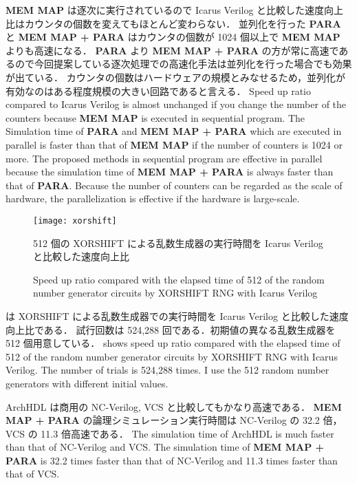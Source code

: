 \textbf{MEM MAP} は逐次に実行されているので Icarus Verilog と比較した速度向上比はカウンタの個数を変えてもほとんど変わらない．
並列化を行った \textbf{PARA} と \textbf{MEM MAP + PARA} はカウンタの個数が 1024 個以上で \textbf{MEM MAP} よりも高速になる．
\textbf{PARA} より \textbf{MEM MAP + PARA} の方が常に高速であるので今回提案している逐次処理での高速化手法は並列化を行った場合でも効果が出ている．
カウンタの個数はハードウェアの規模とみなせるため，並列化が有効なのはある程度規模の大きい回路であると言える．
\fi
Speed up ratio compared to Icarus Verilog is almost unchanged if you change the number of the counters because \textbf{MEM MAP} is executed in sequential program.
The Simulation time of \textbf{PARA} and \textbf{MEM MAP + PARA} which are executed in parallel is faster than that of \textbf{MEM MAP} if the number of counters is 1024 or more.
The proposed methods in sequential program are effective in parallel
because the simulation time of \textbf{MEM MAP + PARA} is always faster than that of \textbf{PARA}.
Because the number of counters can be regarded as the scale of hardware, the parallelization is effective if the hardware is large-scale.


\begin{figure}[tb]
 \centering
 \texttt{[image: xorshift]}
 \caption{512 個の XORSHIFT による乱数生成器の実行時間を Icarus Verilog と比較した速度向上比}
\fi
 \caption{Speed up ratio compared with the elapsed time of 512 of the random number generator circuits by XORSHIFT RNG with Icarus Verilog}
 \label{fig:xorshift}
\end{figure}

 は XORSHIFT による乱数生成器での実行時間を Icarus Verilog と比較した速度向上比である．
試行回数は 524,288 回である．初期値の異なる乱数生成器を 512 個用意している．
\fi
{} shows speed up ratio compared with the elapsed time of 512 of the random number generator circuits by XORSHIFT RNG with Icarus Verilog.
The number of trials is 524,288 times.
I use the 512 random number generators with different initial values.

ArchHDL は商用の NC-Verilog, VCS と比較してもかなり高速である．
\textbf{MEM MAP + PARA} の論理シミュレーション実行時間は NC-Verilog の 32.2 倍，VCS の 11.3 倍高速である．
\fi
The simulation time of ArchHDL is much faster than that of NC-Verilog and VCS.
The simulation time of \textbf{MEM MAP + PARA} is 32.2 times faster than that of NC-Verilog and 11.3 times faster than that of VCS.


